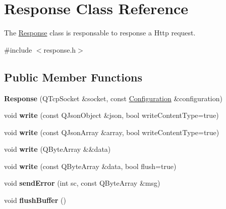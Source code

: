 \hypertarget{class_response}{}\section{Response Class Reference}
\label{class_response}


The \hyperlink{class_response}{Response} class is responsable to response a Http request.  




{\ttfamily \#include $<$response.\+h$>$}

\subsection*{Public Member Functions}
\begin{DoxyCompactItemize}
\item 
\mbox{\label{class_response_a199c4da036e1bea08eb0693140b8a4e0}} 
{\bfseries Response} (Q\+Tcp\+Socket \&socket, const \hyperlink{class_configuration}{Configuration} \&configuration)
\item 
\mbox{\label{class_response_abe45c271ceff4711972d44029d7aca0a}} 
void {\bfseries write} (const Q\+Json\+Object \&json, bool write\+Content\+Type=true)
\item 
\mbox{\label{class_response_aebe6eaba08522c944ad5f05131d0b55b}} 
void {\bfseries write} (const Q\+Json\+Array \&array, bool write\+Content\+Type=true)
\item 
\mbox{\label{class_response_a597628c77d25f5f71708bda977daf5bf}} 
void {\bfseries write} (Q\+Byte\+Array \&\&data)
\item 
\mbox{\label{class_response_a438b172ba3b22cfebe453879fbb043f4}} 
void {\bfseries write} (const Q\+Byte\+Array \&data, bool flush=true)
\item 
\mbox{\label{class_response_a478441dad471d91725c2d3664b073bd0}} 
void {\bfseries send\+Error} (int sc, const Q\+Byte\+Array \&msg)
\item 
\mbox{\label{class_response_a9f70f5c6621b165bcaf1c530ec1db52e}} 
void {\bfseries flush\+Buffer} ()
\item 

\end{DoxyCompactItemize}

